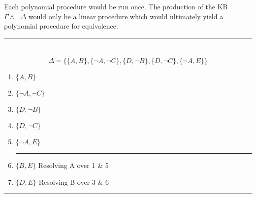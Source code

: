 \documentclass{article}
\begin{document}
 Each polynomial procedure would be run once. The production of the KB $\Gamma \land \lnot \Delta$ would only be a linear procedure which would ultimately yield a polynomial procedure for equivalence.
 
 \noindent\rule{16cm}{0.4pt}
 \section{}
 \[\Delta = \{\{A, B\}, \{\lnot A, \lnot C\}, \{D, \lnot B \}, \{D, \lnot C \}, \{\lnot A, E\}\}\]
  \renewcommand{\labelenumi}{\arabic{enumi}.}
 \begin{enumerate}
 \item $\{A, B\}$
 \item $\{\lnot A, \lnot C\}$
 \item $\{D, \lnot B \}$
 \item $\{D, \lnot C \}$
 \item $\{\lnot A, E \}$
 \newline
 \noindent\rule{4cm}{0.4pt}
 \item $\{B, E \}$ \quad Resolving A over 1 \& 5
 \item $\{D, E \}$ \quad Resolving B over 3 \& 6
 \end{enumerate}
 
 \noindent\rule{16cm}{0.4pt}
\end{document}

